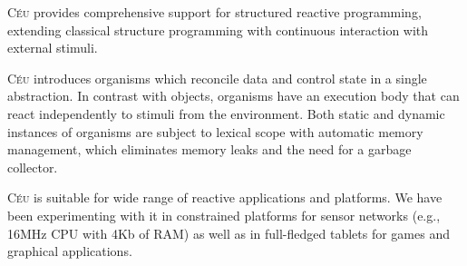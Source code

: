 \documentclass{acm_proc_article-sp}
\newcommand{\CEU}{\textsc{C\'{e}u}\xspace}
\newcommand{\1}{\;}
\newcommand{\2}{\;\;}
\newcommand{\3}{\;\;\;}
\newcommand{\5}{\;\;\;\;\;}
\begin{document}
\CEU provides comprehensive support for structured reactive programming, 
extending classical structure programming with continuous interaction with
external stimuli.

\CEU introduces organisms which reconcile data and control state in a single 
abstraction.
%
In contrast with objects, organisms have an execution body that can react 
independently to stimuli from the environment.
%
Both static and dynamic instances of organisms are subject to lexical scope 
with automatic memory management, which eliminates memory leaks and the need 
for a garbage collector.

\CEU is suitable for wide range of reactive applications and platforms.
%
We have been experimenting with it in constrained platforms for sensor networks 
(e.g., 16MHz CPU with 4Kb of RAM) as well as in full-fledged tablets for games 
and graphical applications.




\end{document}

